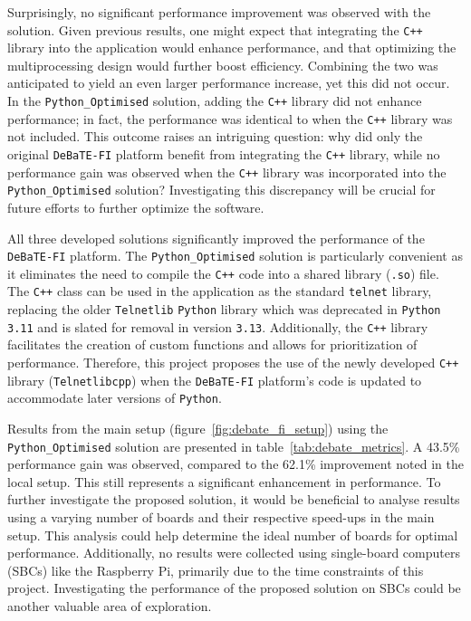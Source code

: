 Surprisingly, no significant performance improvement was observed with the \texttt{} solution. Given previous results, one might expect that integrating the \texttt{C++} library into the application would enhance performance, and that optimizing the multiprocessing design would further boost efficiency. Combining the two was anticipated to yield an even larger performance increase, yet this did not occur. In the \texttt{Python\_Optimised} solution, adding the \texttt{C++} library did not enhance performance; in fact, the performance was identical to when the \texttt{C++} library was not included. This outcome raises an intriguing question: why did only the original \texttt{DeBaTE-FI} platform benefit from integrating the \texttt{C++} library, while no performance gain was observed when the \texttt{C++} library was incorporated into the \texttt{Python\_Optimised} solution? Investigating this discrepancy will be crucial for future efforts to further optimize the software.

All three developed solutions significantly improved the performance of the \texttt{DeBaTE-FI} platform. The \texttt{Python\_Optimised} solution is particularly convenient as it eliminates the need to compile the \texttt{C++} code into a shared library (\texttt{.so}) file. The \texttt{C++} class can be used in the application as the standard \texttt{telnet} library, replacing the older \texttt{Telnetlib} \texttt{Python} library which was deprecated in \texttt{Python 3.11} and is slated for removal in version \texttt{3.13}\cite{PythonTelnetlib}. Additionally, the \texttt{C++} library facilitates the creation of custom functions and allows for prioritization of performance. Therefore, this project proposes the use of the newly developed \texttt{C++} library (\texttt{Telnetlibcpp}) when the \texttt{DeBaTE-FI} platform's code is updated to accommodate later versions of \texttt{Python}.

Results from the main setup (figure~\ref{fig:debate_fi_setup}) using the \texttt{Python\_Optimised} solution are presented in table~\ref{tab:debate_metrics}. A 43.5\% performance gain was observed, compared to the 62.1\% improvement noted in the local setup. This still represents a significant enhancement in performance. To further investigate the proposed solution, it would be beneficial to analyse results using a varying number of boards and their respective speed-ups in the main setup. This analysis could help determine the ideal number of boards for optimal performance. Additionally, no results were collected using single-board computers (SBCs) like the Raspberry Pi, primarily due to the time constraints of this project. Investigating the performance of the proposed solution on SBCs could be another valuable area of exploration.

